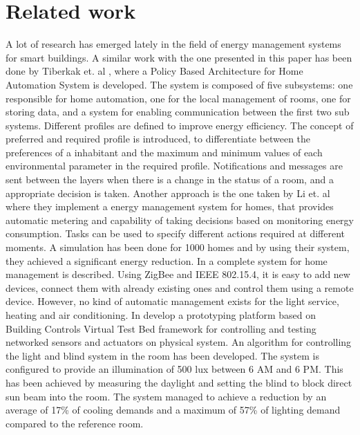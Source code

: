 \section{Related work}
A lot of research has emerged lately in the field of energy management systems for smart buildings. 
A similar work with the one presented in this paper has been done by Tiberkak et. al \cite{Tiberkak10}, where a Policy Based Architecture for Home Automation
System is developed. The system is composed of five subsystems: one responsible
for home automation, one for the local management of rooms, one
for storing data, and a system for enabling communication between the first
two sub systems. Different profiles are defined to improve energy efficiency.
The concept of preferred and required profile is introduced, to differentiate
between the preferences of a inhabitant and the maximum and minimum values
of each environmental parameter in the required profile. Notifications
and messages are sent between the layers when there is a change in the
status of a room, and a appropriate decision is taken.
Another approach is the one taken by Li et. al \cite{Li11} where they implement a energy management system for homes, that provides automatic metering and capability of taking decisions based on monitoring energy consumption. 
Tasks can be used to specify different actions required at different moments. A simulation has been done for 1000 homes and by using their system, they achieved a significant energy reduction.
In \cite{Han10} a complete system for home management is described. Using ZigBee and IEEE 802.15.4, it is easy to add new devices, connect them with already existing  ones and control them using a remote device. However, no kind of automatic management exists for the light service, heating and air conditioning. In \cite{Wen11} develop a prototyping platform based on Building Controls Virtual Test Bed framework \cite{Bcvtb} for controlling and testing networked sensors and actuators on physical system. An algorithm for controlling the light and blind system in the room has been developed. The system is configured to provide an illumination of 500 lux between 6 AM and 6 PM. This has been achieved by measuring the daylight and setting the blind to block direct sun beam into the room. The system managed to achieve a reduction by an average of 17\% of cooling demands and a maximum of 57\% of lighting demand compared to the reference room. 